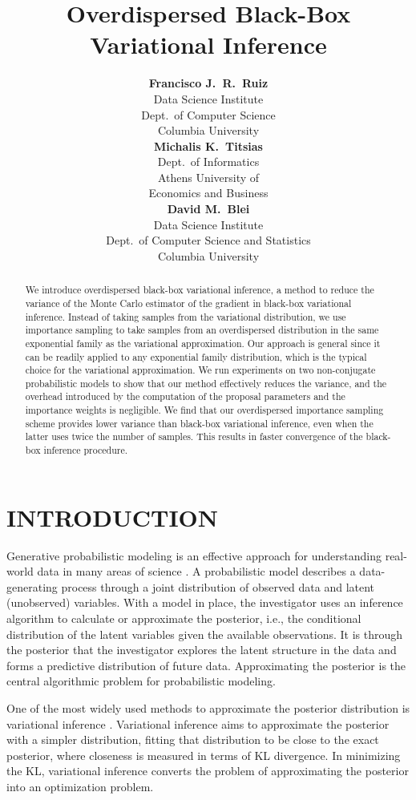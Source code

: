 \documentclass[]{article}
\title{Overdispersed Black-Box Variational Inference}
\author{%
{\bf Francisco J.~R.~Ruiz} \\
Data Science Institute \\
Dept.~of Computer Science\\
Columbia University\\
\And
{\bf Michalis K.~Titsias}  \\
Dept.~of Informatics\\
Athens University of\\Economics and Business  \\
\And
{\bf David M.~Blei}   \\
Data Science Institute \\
Dept.~of Computer Science and Statistics    \\
Columbia University\\
}
\begin{document}
\maketitle

\begin{abstract}
  We introduce overdispersed black-box variational inference, 
  a method to reduce the variance of the Monte Carlo
  estimator of the gradient in black-box variational inference.
  Instead of taking samples from the variational distribution, we use
  importance sampling to take samples from an overdispersed
  distribution in the same exponential family as the variational
  approximation. Our approach is general since it can be readily
  applied to any exponential family distribution, which is the typical
  choice for the variational approximation. We run experiments
  on two non-conjugate probabilistic models to show
  that our method effectively reduces the variance, and the
  overhead introduced by the computation of the proposal parameters
  and the importance weights is negligible. We find that
  our overdispersed importance sampling scheme provides lower variance
  than black-box variational inference, even when the latter uses twice
  the number of samples. This results in faster convergence of the
  black-box inference procedure.
\end{abstract}

\section{INTRODUCTION}

Generative probabilistic modeling is an effective approach for
understanding real-world data in many areas of science
\citep{Bishop2006,Murphy2012}. A probabilistic model describes a data-generating
process through a joint distribution of observed data and latent
(unobserved) variables. With a model in place, the investigator uses
an inference algorithm to calculate or approximate the posterior,
i.e., the conditional distribution of the latent variables given the
available observations. It is through the posterior that the
investigator explores the latent structure in the data and forms a
predictive distribution of future data. Approximating the posterior is
the central algorithmic problem for probabilistic modeling.

One of the most widely used methods to approximate the posterior
distribution is variational inference
\citep{Wainwright2008,Jordan1999}. Variational inference aims to
approximate the posterior with a simpler distribution, fitting that
distribution to be close to the exact posterior, where closeness is
measured in terms of \gls{KL} divergence. In minimizing the \gls{KL},
variational inference converts the problem of approximating the
posterior into an optimization problem.
\end{document}
